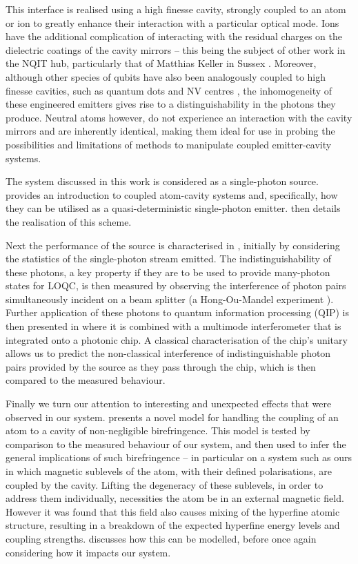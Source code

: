 \documentclass[../Thesis-IJspeert.tex]{subfiles}
\begin{document}
This interface is realised using a high finesse cavity, strongly coupled to an atom or ion to greatly enhance their interaction with a particular optical mode.  Ions have the additional complication of interacting with the residual charges on the dielectric coatings of the cavity mirrors -- this being the subject of other work in the NQIT hub, particularly that of Matthias Keller in Sussex \cite{takahashi13, keller07}.  Moreover, although other species of qubits have also been analogously coupled to high finesse cavities, such as quantum dots \cite{hennessy07,senellart17} and NV centres \cite{riedel17,faraon12}, the inhomogeneity of these engineered emitters gives rise to a distinguishability in the photons they produce.  Neutral atoms however, do not experience an interaction with the cavity mirrors and are inherently identical, making them ideal for use in probing the possibilities and limitations of methods to manipulate coupled emitter-cavity systems.

The system discussed in this work is considered as a single-photon source.  provides an introduction to coupled atom-cavity systems and, specifically, how they can be utilised as a quasi-deterministic single-photon emitter.   then details the realisation of this scheme.

Next the performance of the source is characterised in , initially by considering the statistics of the single-photon stream emitted.  The indistinguishability of these photons, a key property if they are to be used to provide many-photon states for LOQC, is then measured by observing the interference of photon pairs simultaneously incident on a beam splitter (a Hong-Ou-Mandel experiment \cite{hong87}).  Further application of these photons to quantum information processing (QIP) is then presented in  where it is combined with a multimode interferometer that is integrated onto a photonic chip.  A classical characterisation of the chip's unitary allows us to predict the non-classical interference of indistinguishable photon pairs provided by the source as they pass through the chip, which is then compared to the measured behaviour.

Finally we turn our attention to interesting and unexpected effects that were observed in our system.   presents a novel model for handling the coupling of an atom to a cavity of non-negligible birefringence.  This model is tested by comparison to the measured behaviour of our system, and then used to infer the general implications of such birefringence -- in particular on a system such as ours in which magnetic sublevels of the atom, with their defined polarisations, are coupled by the cavity.  Lifting the degeneracy of these sublevels, in order to address them individually, necessities the atom be in an external magnetic field.  However it was found that this field also causes mixing of the hyperfine atomic structure, resulting in a breakdown of the expected hyperfine energy levels and coupling strengths.   discusses how this can be modelled, before once again considering how it impacts our system.
\end{document}
